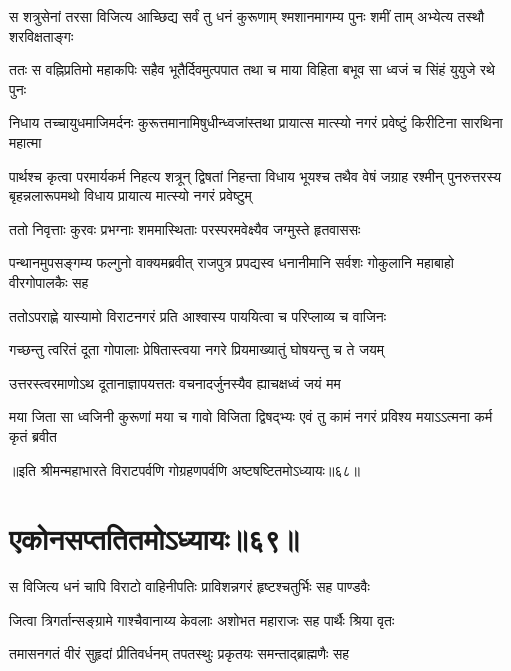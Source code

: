 


\fourlineindentedshloka
{स शत्रुसेनां तरसा विजित्य}
{आच्छिद्य सर्वं तु धनं कुरूणाम्}
{श्मशानमागम्य पुनः शमीं ताम्}
{अभ्येत्य तस्थौ शरविक्षताङ्गः}


\fourlineindentedshloka
{ततः स वह्निप्रतिमो महाकपिः}
{सहैव भूतैर्दिवमुत्पपात}
{तथा च माया विहिता बभूव सा}
{ध्वजं च सिंहं युयुजे रथे पुनः}


\fourlineindentedshloka
{निधाय तच्चायुधमाजिमर्दनः}
{कुरूत्तमानामिषुधीन्ध्वजांस्तथा}
{प्रायात्स मात्स्यो नगरं प्रवेष्टुं}
{किरीटिना सारथिना महात्मा}


\sixlineindentedshloka
{पार्थश्च कृत्वा परमार्यकर्म}
{निहत्य शत्रून् द्विषतां निहन्ता}
{विधाय भूयश्च तथैव वेषं}
{जग्राह रश्मीन् पुनरुत्तरस्य}
{बृहन्नलारूपमथो विधाय}
{प्रायात्य मात्स्यो नगरं प्रवेष्टुम्}



\twolineshloka
{ततो निवृत्ताः कुरवः प्रभग्नाः शममास्थिताः}
{परस्परमवेक्ष्यैव जग्मुस्ते हृतवाससः}


\threelineshloka
{पन्थानमुपसङ्गम्य फल्गुनो वाक्यमब्रवीत्}
{राजपुत्र प्रपद्यस्व धनानीमानि सर्वशः}
{गोकुलानि महाबाहो वीरगोपालकैः सह}


\twolineshloka
{ततोऽपराह्णे यास्यामो विराटनगरं प्रति}
{आश्वास्य पाययित्वा च परिप्लाव्य च वाजिनः}



\twolineshloka
{गच्छन्तु त्वरितं दूता गोपालाः प्रेषितास्त्वया}
{नगरे प्रियमाख्यातुं घोषयन्तु च ते जयम्}


\twolineshloka
{उत्तरस्त्वरमाणोऽथ दूतानाज्ञापयत्ततः}
{वचनादर्जुनस्यैव ह्याचक्षध्वं जयं मम}


\fourlineindentedshloka
{मया जिता सा ध्वजिनी कुरूणां}
{मया च गावो विजिता द्विषद्भ्यः}
{एवं तु कामं नगरं प्रविश्य}
{मयाऽऽत्मना कर्म कृतं ब्रवीत}

॥इति श्रीमन्महाभारते विराटपर्वणि गोग्रहणपर्वणि अष्टषष्टितमोऽध्यायः॥६८॥

\chapter{एकोनसप्ततितमोऽध्यायः॥६९॥}

\twolineshloka
{स विजित्य धनं चापि विराटो वाहिनीपतिः}
{प्राविशन्नगरं हृष्टश्चतुर्भिः सह पाण्डवैः}


\twolineshloka
{जित्वा त्रिगर्तान्सङ्ग्रामे गाश्चैवानाय्य केवलाः}
{अशोभत महाराजः सह पार्थैः श्रिया वृतः}


\twolineshloka
{तमासनगतं वीरं सुहृदां प्रीतिवर्धनम्}
{तपतस्थुः प्रकृतयः समन्ताद्ब्राह्मणैः सह}


